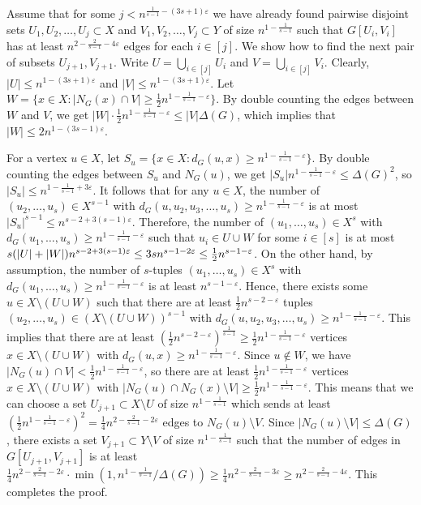 \documentclass[a4paper,11pt]{article}
\makeatletter
\renewenvironment{proof}[1][\proofname] {\par\pushQED{\qed}\normalfont\topsep6\p@\@plus6\p@\relax\trivlist\item[\hskip\labelsep\bfseries#1\@addpunct{.}]\ignorespaces}{\popQED\endtrivlist\@endpefalse}
\theoremstyle{definition}
\def\eps{\varepsilon}
\makeatother
\begin{document}
\begin{proof}
Assume that for some $j<n^{\frac{1}{s-1}-(3s+1)\eps}$ we have already found pairwise disjoint sets $U_1,U_2,\dots,U_j\subset X$ and $V_1,V_2,\dots,V_j\subset Y$ of size $n^{1-\frac{1}{s-1}}$ such that $G[U_i,V_i]$ has at least $n^{2-\frac{2}{s-1}-4\eps}$ edges for each $i\in [j]$. We show how to find the next pair of subsets $U_{j+1}, V_{j+1}$. Write $U=\bigcup_{i\in [j]} U_i$ and $V=\bigcup_{i\in [j]} V_i$. Clearly, $|U|\leq n^{1-(3s+1)\eps}$ and $|V|\leq n^{1-(3s+1)\eps}$. Let $W=\{x\in X: |N_G(x)\cap V|\geq \frac{1}{2}n^{1-\frac{1}{s-1}-\eps}\}$. By double counting the edges between $W$ and $V$, we get $|W|\cdot \frac{1}{2}n^{1-\frac{1}{s-1}-\eps}\leq |V|\Delta(G)$, which implies that $|W|\leq 2n^{1-(3s-1)\eps}$.

For a vertex $u\in X$, let $S_u=\{x\in X: d_G(u,x)\geq n^{1-\frac{1}{s-1}-\eps}\}$. By double counting the edges between $S_u$ and $N_G(u)$, we get $|S_u|n^{1-\frac{1}{s-1}-\eps}\leq \Delta(G)^2$, so $|S_u|\leq n^{1-\frac{1}{s-1}+3\eps}$. It follows that for any $u\in X$, the number of $(u_2,\dots,u_s)\in X^{s-1}$ with $d_G(u,u_2,u_3,\dots,u_s)\geq n^{1-\frac{1}{s-1}-\eps}$ is at most $|S_u|^{s-1}\leq n^{s-2+3(s-1)\eps}$. Therefore, the number of $(u_1,\dots,u_s)\in X^s$ with $d_G(u_1,\dots,u_s)\geq n^{1-\frac{1}{s-1}-\eps}$ such that $u_i\in U\cup W$ for some $i\in [s]$ is at most $s(|U|+\nolinebreak |W|)n^{s-2+3(s-1)\eps}\leq 3sn^{s-1-2\eps}\leq \frac{1}{2}n^{s-1-\eps}$. 
On the other hand, by assumption, the number of $s$-tuples $(u_1,\dots,u_s) \in X^s$ with $d_G(u_1,\dots,u_s)\geq n^{1-\frac{1}{s-1}-\eps}$ is at least $n^{s-1-\eps}$.
Hence, there exists some $u\in X\setminus (U\cup W)$ such that there are at least $\frac{1}{2}n^{s-2-\eps}$ tuples $(u_2,\dots,u_s)\in (X\setminus (U\cup W))^{s-1}$ with $d_G(u,u_2,u_3,\dots,u_s)\geq n^{1-\frac{1}{s-1}-\eps}$. This implies that there are at least $(\frac{1}{2}n^{s-2-\eps})^{\frac{1}{s-1}}\geq \frac{1}{2}n^{1-\frac{1}{s-1}-\eps}$ vertices $x\in X\setminus (U\cup W)$ with $d_G(u,x)\geq n^{1-\frac{1}{s-1}-\eps}$. Since $u\not \in W$, we have $|N_G(u)\cap V|< \frac{1}{2}n^{1-\frac{1}{s-1}-\eps}$, so there are at least $\frac{1}{2}n^{1-\frac{1}{s-1}-\eps}$ vertices $x\in X\setminus (U\cup W)$ with $|N_G(u)\cap N_G(x)\setminus V|\geq \frac{1}{2}n^{1-\frac{1}{s-1}-\eps}$. This means that we can choose a set $U_{j+1}\subset X\setminus U$ of size $n^{1-\frac{1}{s-1}}$ which sends at least $(\frac{1}{2}n^{1-\frac{1}{s-1}-\eps})^2=\frac{1}{4}n^{2-\frac{2}{s-1}-2\eps}$ edges to $N_G(u)\setminus V$. Since $|N_G(u)\setminus V|\leq \Delta(G)$, there exists a set $V_{j+1}\subset Y\setminus V$ of size $n^{1-\frac{1}{s-1}}$ such that the number of edges in $G[U_{j+1},V_{j+1}]$ is at least 
$\frac{1}{4}n^{2-\frac{2}{s-1}-2\eps} \cdot \min\left(1,n^{1-\frac{1}{s-1}}/\Delta(G)\right) \geq   \frac{1}{4}n^{2-\frac{2}{s-1}-3\eps}\geq n^{2-\frac{2}{s-1}-4\eps}$. This completes the proof.
\end{proof}
\end{document}
